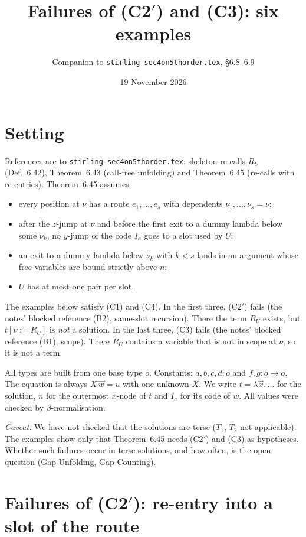 \documentclass[11pt]{article}
\title{Failures of (C2$'$) and (C3): six examples}
\author{Companion to \texttt{stirling-sec4on5thorder.tex}, \S6.8--6.9}
\date{19 November 2026}
\begin{document}
\maketitle

\section*{Setting}

References are to \texttt{stirling-sec4on5thorder.tex}: skeleton
re-calls $R_U$ (Def.~6.42), Theorem~6.43 (call-free unfolding) and
Theorem~6.45 (re-calls with re-entries).  Theorem~6.45 assumes
\begin{itemize}
\item[(C1)] every position at $\nu$ has a route $e_1,\dots,e_s$ with
  dependents $\nu_1,\dots,\nu_s=\nu$;
\item[(C2$'$)] after the $z$-jump at $\nu$ and before the first exit to a
  dummy lambda below some $\nu_k$, no $y$-jump of the code $I_a$ goes to a
  slot used by $U$;
\item[(C3)] an exit to a dummy lambda below $\nu_k$ with $k<s$ lands in an
  argument whose free variables are bound strictly above $n$;
\item[(C4)] $U$ has at most one pair per slot.
\end{itemize}
The examples below satisfy (C1) and (C4).  In the first three, (C2$'$)
fails (the notes' blocked reference (B2), same-slot recursion).  There
the term $R_U$ exists, but $t[\nu:=R_U]$ is \emph{not} a solution.  In
the last three, (C3) fails (the notes' blocked reference (B1), scope).
There $R_U$ contains a variable that is not in scope at $\nu$, so it is
not a term.

All types are built from one base type $o$.  Constants: $a,b,c,d:o$ and
$f,g:o\to o$.  The equation is always $X\,\vec w=u$ with one unknown $X$.
We write $t=\lambda\vec x.\,\dots$ for the solution, $n$ for the outermost
$x$-node of $t$ and $I_a$ for its code of $w$.  All values were checked by
$\beta$-normalisation.

\emph{Caveat.}  We have not checked that the solutions are terse ($T_1$,
$T_2$ not applicable).  The examples show only that
Theorem~6.45 needs (C2$'$) and (C3) as hypotheses.  Whether such
failures occur in terse solutions, and how often, is the open question
(Gap-Unfolding, Gap-Counting).

\section{Failures of (C2$'$): re-entry into a slot of the route}
\end{document}
